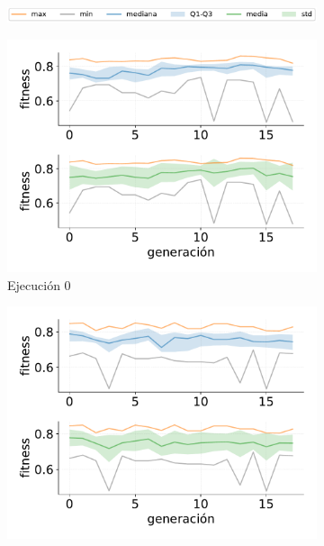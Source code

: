 \begin{figure}
\centering
    \begin{subfigure}{1\textwidth}
        \centering
        \includegraphics[width=\textwidth]{figuras/experimentos/exp_no_elitismo/legend.pdf}
    \end{subfigure}
    \begin{subfigure}{0.47\textwidth}
        \centering
        \includegraphics[width=\textwidth]{figuras/experimentos/exp_no_elitismo/no_elitismo_0.pdf}
        \caption{Ejecución 0}
    \end{subfigure}
    \hfill
    \begin{subfigure}{0.47\textwidth}
        \centering
        \includegraphics[width=\textwidth]{figuras/experimentos/exp_no_elitismo/no_elitismo_1.pdf}

\end{subfigure}
\end{figure}
